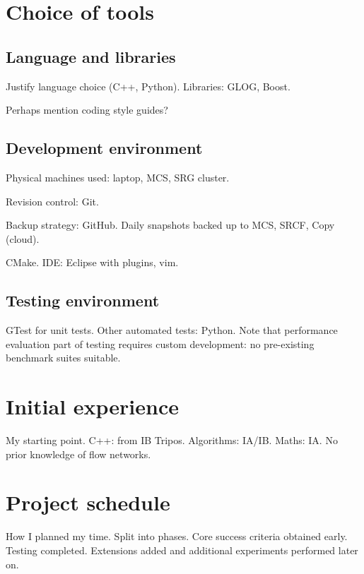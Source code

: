 \section{Choice of tools} \label{sec:prep-tool-choice}
\subsection{Language and libraries}
Justify language choice (C++, Python). Libraries: GLOG, Boost.

Perhaps mention coding style guides?

\subsection{Development environment}
Physical machines used: laptop, MCS, SRG cluster.

Revision control: Git.

Backup strategy: GitHub. Daily snapshots backed up to MCS, SRCF, Copy (cloud).

CMake. IDE: Eclipse with plugins, vim.

\subsection{Testing environment} \label{sec:prep-tools-testing}
GTest for unit tests. Other automated tests: Python. Note that performance evaluation part of testing requires custom development: no pre-existing benchmark suites suitable.

\section{Initial experience}
My starting point. C++: from IB Tripos. Algorithms: IA/IB. Maths: IA. No prior knowledge of flow networks.

\section{Project schedule} \label{sec:prep-project-schedule}
How I planned my time. Split into phases. Core success criteria obtained early. Testing completed. Extensions added and additional experiments performed later on.
